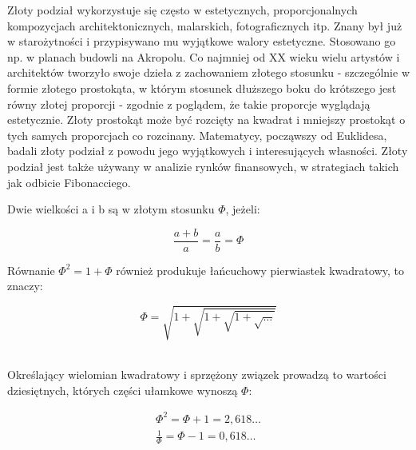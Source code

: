 \documentclass{article}
\begin{document}
Złoty podział wykorzystuje się często w estetycznych, proporcjonalnych kompozycjach architektonicznych, malarskich, fotograficznych itp. Znany był już w starożytności i przypisywano mu wyjątkowe walory estetyczne. Stosowano go np. w planach budowli na Akropolu. Co najmniej od XX wieku wielu artystów i architektów tworzyło swoje dzieła z zachowaniem złotego stosunku - szczególnie w formie złotego prostokąta, w którym stosunek dłuższego boku do krótszego jest równy złotej proporcji - zgodnie z poglądem, że takie proporcje wyglądają estetycznie. Złoty prostokąt może być rozcięty na kwadrat i mniejszy prostokąt o tych samych proporcjach co rozcinany. Matematycy, począwszy od Euklidesa, badali złoty podział z powodu jego wyjątkowych i interesujących własności. Złoty podział jest także używany w analizie rynków finansowych, w strategiach takich jak odbicie Fibonacciego.
\\
 \begin{center}Dwie wielkości a i b są w złotym stosunku $\Phi$, jeżeli:\end{center}
\begin{equation}
\frac{a+b}{a} = \frac{a}{b} = \Phi
\end{equation}
\begin{center} Równanie \begin{math} \Phi^{2} = 1 + \Phi \end{math} również produkuje łańcuchowy pierwiastek kwadratowy, to znaczy:\end{center}
\begin{equation}
\Phi = \sqrt{ 1+\sqrt{1+{\sqrt{1+{\sqrt{\ldots}}}}}}
\end{equation}
\\
\begin{center}Określający wielomian kwadratowy i sprzężony związek prowadzą to wartości dziesiętnych, których części ułamkowe wynoszą $\Phi$:\end{center}
\begin{eqnarray}
\Phi^{2} = \Phi + 1 = 2,618\ldots
\\
\frac{1}{\Phi} = \Phi - 1 = 0,618\ldots
\end{eqnarray}
\end{document}
